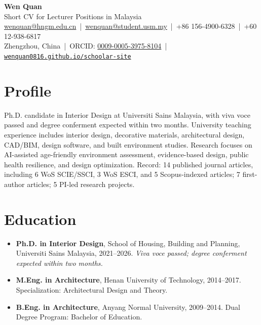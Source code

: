 \documentclass[10pt,a4paper]{article}
\begin{document}
{\Large \textbf{Wen Quan}}\\[-1pt]
\textcolor{subtle}{Short CV for Lecturer Positions in Malaysia}\\[-1pt]
\href{mailto:wenquan@hngm.edu.cn}{wenquan@hngm.edu.cn} \,|\, 
\href{mailto:wenquan@student.usm.my}{wenquan@student.usm.my} \,|\, 
+86 156-4900-6328 \,|\, +60 12-938-6817\\
Zhengzhou, China \,|\, ORCID: \href{https://orcid.org/0009-0005-3975-8104}{0009-0005-3975-8104} \,|\,
\href{https://wenquan0816.github.io/schoolar-site/}{\nolinkurl{wenquan0816.github.io/schoolar-site}}

\section*{Profile}
Ph.D. candidate in Interior Design at Universiti Sains Malaysia, with viva voce passed and degree conferment expected within two months. University teaching experience includes interior design, decorative materials, architectural design, CAD/BIM, design software, and built environment studies. Research focuses on AI-assisted age-friendly environment assessment, evidence-based design, public health resilience, and design optimization. Record: 14 published journal articles, including 6 WoS SCIE/SSCI, 3 WoS ESCI, and 5 Scopus-indexed articles; 7 first-author articles; 5 PI-led research projects.

\section*{Education}
\begin{itemize}
  \item \textbf{Ph.D. in Interior Design}, School of Housing, Building and Planning, Universiti Sains Malaysia, 2021--2026. \textit{Viva voce passed; degree conferment expected within two months.}
  \item \textbf{M.Eng. in Architecture}, Henan University of Technology, 2014--2017. Specialization: Architectural Design and Theory.
  \item \textbf{B.Eng. in Architecture}, Anyang Normal University, 2009--2014. Dual Degree Program: Bachelor of Education.
\end{itemize}
\end{document}
